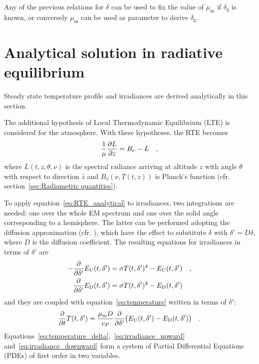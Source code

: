 \documentclass[a4paper,10pt,twocolumn,\classoptions]{article}
\begin{document}
Any of the previous relations for $\delta$ can be used to fix the value of $\mu_\text{m}$ if $\delta_\text{g}$ is known, or conversely $\mu_\text{m}$ can be used as parameter to derive $\delta_\text{g}$.



\section{Analytical solution in radiative equilibrium}
\label{sec:Analytical solution in radiative equilibrium}
Steady state temperature profile and irradiances are derived analytically in this section.

The additional hypothesis of Local Thermodynamic Equilibrium (LTE) is considered for the atmosphere. %
With these hypotheses, the RTE becomes
\begin{equation}
  \label{eq:RTE_analytical}
  \frac{1}{\mu} \pdv{L}{z} = B_\nu - L
  \quad ,
\end{equation}
where $L(t, z, \theta, \nu)$ is the spectral radiance arriving at altitude $z$ with angle $\theta$ with respect to direction $\hat{z}$ and $B_\nu(\nu, T(t,z))$ is Planck's function (cfr. section~\ref{sec:Radiometric quantities}).

To apply equation~\eqref{eq:RTE_analytical} to irradiances, two integrations are needed: one over the whole EM spectrum and one over the solid angle corresponding to a hemisphere. The latter can be performed adopting the diffusion approximation (cfr. \cite[55]{Catling}), which have the effect to substitute $\delta$ with $\delta' = D \delta$, where $D$ is the diffusion coefficient.
The resulting equations for irradiances in terms of $\delta'$ are
\begin{align}
  \label{eq:irradiance_upward}
  - \pdv*{E_\text{U}(t, \delta')}{\delta'} & = \sigma T(t, \delta')^4 - E_\text{U}(t, \delta') \quad , \\
  \label{eq:irradiance_downward}
  \pdv*{E_\text{D}(t, \delta')}{\delta'} & = \sigma T(t, \delta')^4 - E_\text{D}(t, \delta')
\end{align}
and they are coupled with equation~\eqref{eq:temperature} written in terms of $\delta'$:
\begin{equation}
  \label{eq:temperature_delta}
  \pdv*{T(t, \delta')}{t} = \frac{\mu_\text{m} D}{c_P} \pdv*{\big( E_\text{U}(t, \delta') - E_\text{D}(t, \delta') \big)}{\delta'}
  \quad .
\end{equation}
Equations~\eqref{eq:temperature_delta},~\eqref{eq:irradiance_upward} and~\eqref{eq:irradiance_downward} form a system of Partial Differential Equations (PDEs) of first order in two variables.
\end{document}
